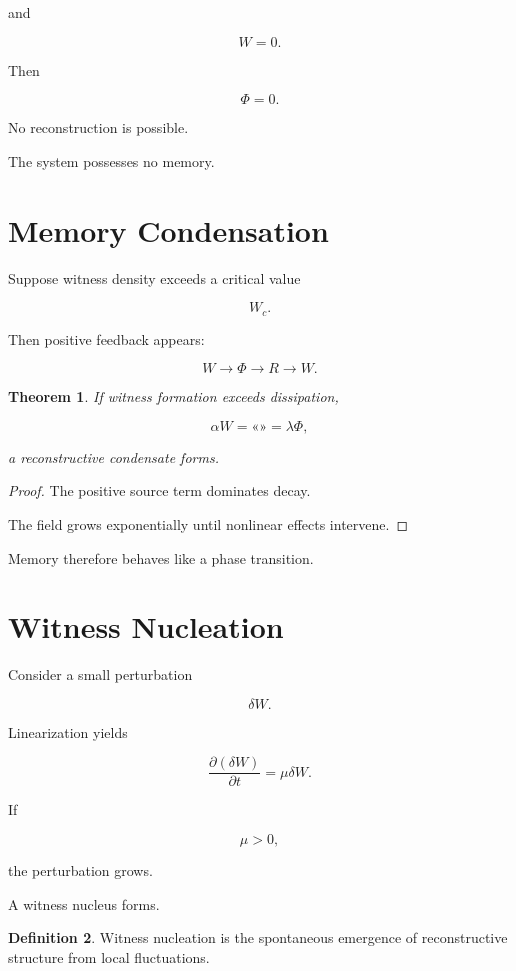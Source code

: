 \documentclass[12pt,oneside]{book}
\theoremstyle{plain} \newtheorem{theorem}{Theorem}[chapter] \newtheorem{lemma}[theorem]{Lemma} \newtheorem{proposition}[theorem]{Proposition} \newtheorem{corollary}[theorem]{Corollary}
\theoremstyle{definition} \newtheorem{definition}[theorem]{Definition} \newtheorem{axiom}[theorem]{Axiom} \newtheorem{construction}[theorem]{Construction}
\theoremstyle{remark} \newtheorem{remark}[theorem]{Remark} \newtheorem{example}[theorem]{Example}
\begin{document}
and

\[
W=0.
\]

Then

\[
\Phi=0.
\]

No reconstruction is possible.

The system possesses no memory.

\section{Memory Condensation}

Suppose witness density exceeds a critical value

\[
W_c.
\]

Then positive feedback appears:

\[
W
\rightarrow
\Phi
\rightarrow
R
\rightarrow
W.
\]

\begin{theorem}

If witness formation exceeds dissipation,

\[
\alpha W
=
«»
=
\lambda\Phi,
\]

a reconstructive condensate forms.

\end{theorem}

\begin{proof}

The positive source term dominates decay.

The field grows exponentially until nonlinear effects intervene.

\end{proof}

Memory therefore behaves like a phase transition.

\section{Witness Nucleation}

Consider a small perturbation

\[
\delta W.
\]

Linearization yields

\[
\frac{\partial (\delta W)}{\partial t}
=
\mu \delta W.
\]

If

\[
\mu>0,
\]

the perturbation grows.

A witness nucleus forms.

\begin{definition}

Witness nucleation is the spontaneous emergence of reconstructive structure from local fluctuations.

\end{definition}
\end{document}
